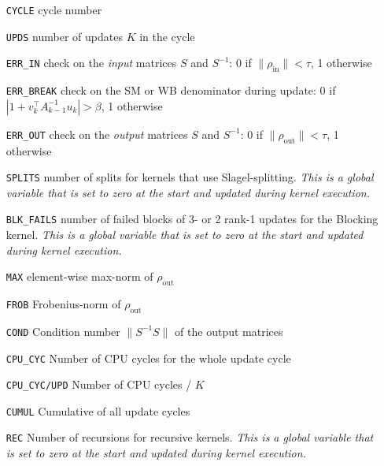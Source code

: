 \documentclass[11pt]{article}
\numberwithin{figure}{section}
\numberwithin{table}{section}
\begin{document}
			\begin{itemize}
				\item [\texttt{CYCLE}] cycle number
				\item [\texttt{UPDS}] number of updates $K$ in the cycle
				\item [\texttt{ERR\_IN}] check on the \emph{input} matrices $S$ and $S^{-1}$: 0 if $\|\rho_\mathrm{in}\|<\tau$, 1 otherwise
				\item [\texttt{ERR\_BREAK}] check on the SM or WB denominator during  update: 0 if $\left|1+v_k^\top A_{k-1}^{-1}u_k\right| > \beta$, 1 otherwise
				\item [\texttt{ERR\_OUT}] check on the \emph{output} matrices $S$ and $S^{-1}$: 0 if $\|\rho_\mathrm{out}\|<\tau$, 1 otherwise
				\item [\texttt{SPLITS}] number of splits for kernels that use Slagel-splitting. \emph{This is a global variable that is set to zero at the start and updated during kernel execution.}
				\item [\texttt{BLK\_FAILS}] number of failed blocks of 3- or 2 rank-1 updates for the Blocking kernel. \emph{This is a global variable that is set to zero at the start and updated during kernel execution.}
				\item [\texttt{MAX}] element-wise max-norm of $\rho_\mathrm{out}$ 
				\item [\texttt{FROB}] Frobenius-norm of $\rho_\mathrm{out}$ 
				\item [\texttt{COND}] Condition number $\|S^{-1}S\|$ of the output matrices
				\item [\texttt{CPU\_CYC}] Number of CPU cycles for the whole update cycle
				\item [\texttt{CPU\_CYC/UPD}] Number of CPU cycles /  $K$
				\item [\texttt{CUMUL}] Cumulative of all update cycles
				\item [\texttt{REC}] Number of recursions for recursive kernels. \emph{This is a global variable that is set to zero at the start and updated during kernel execution.}
			\end{itemize}
			
\end{document}
